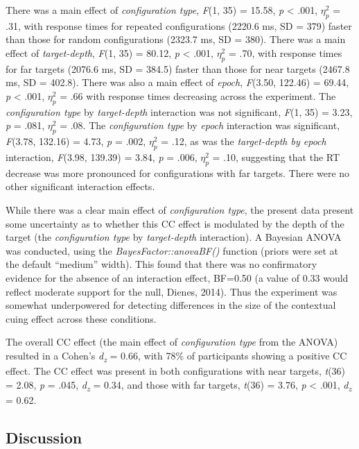 \documentclass[
  man,floatsintext]{apa7}
\begin{document}
There was a main effect of \emph{configuration type}, \emph{F}(1, 35) = 15.58, \emph{p} \textless{} .001, \(\eta^2_p\) = .31, with response times for repeated configurations (2220.6 ms, SD = 379) faster than those for random configurations (2323.7 ms, SD = 380). There was a main effect of \emph{target-depth}, \emph{F}(1, 35) = 80.12, \emph{p} \textless{} .001, \(\eta^2_p\) = .70, with response times for far targets (2076.6 ms, SD = 384.5) faster than those for near targets (2467.8 ms, SD = 402.8). There was also a main effect of \emph{epoch}, \emph{F}(3.50, 122.46) = 69.44, \emph{p} \textless{} .001, \(\eta^2_p\) = .66 with response times decreasing across the experiment. The \emph{configuration type} by \emph{target-depth} interaction was not significant, \emph{F}(1, 35) = 3.23, \emph{p} = .081, \(\eta^2_p\) = .08. The \emph{configuration type} by \emph{epoch} interaction was significant, \emph{F}(3.78, 132.16) = 4.73, \emph{p} = .002, \(\eta^2_p\) = .12, as was the \emph{target-depth by epoch} interaction, \emph{F}(3.98, 139.39) = 3.84, \emph{p} = .006, \(\eta^2_p\) = .10, suggesting that the RT decrease was more pronounced for configurations with far targets. There were no other significant interaction effects.

While there was a clear main effect of \emph{configuration type}, the present data present some uncertainty as to whether this CC effect is modulated by the depth of the target (the \emph{configuration type} by \emph{target-depth} interaction). A Bayesian ANOVA was conducted, using the \emph{BayesFactor::anovaBF()} function (priors were set at the default ``medium'' width). This found that there was no confirmatory evidence for the absence of an interaction effect, BF=0.50 (a value of 0.33 would reflect moderate support for the null, Dienes, 2014). Thus the experiment was somewhat underpowered for detecting differences in the size of the contextual cuing effect across these conditions.

The overall CC effect (the main effect of \emph{configuration type} from the ANOVA) resulted in a Cohen's \emph{d\textsubscript{z}} = 0.66, with 78\% of participants showing a positive CC effect. The CC effect was present in both configurations with near targets, \emph{t}(36) = 2.08, \emph{p} = .045, \emph{d\textsubscript{z}} = 0.34, and those with far targets, \emph{t}(36) = 3.76, \emph{p} \textless{} .001, \emph{d\textsubscript{z}} = 0.62.

\hypertarget{discussion}{%
\subsection{Discussion}\label{discussion}}
\end{document}
